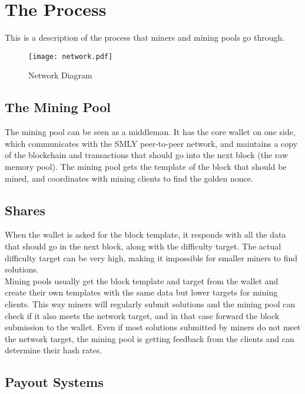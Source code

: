 \section{The Process}

This is a description of the process that miners and mining pools go through.

\begin{figure}[h]
    \centering
    \texttt{[image: network.pdf]}
    \caption{Network Diagram}
    \label{fig:block_header}
\end{figure}

\subsection{The Mining Pool}

The mining pool can be seen as a middleman. It has the core wallet on one side, which communicates with the SMLY peer-to-peer network, and maintains a copy of the blockchain and transactions that should go into the next block (the raw memory pool). The mining pool gets the template of the block that should be mined, and coordinates with mining clients to find the golden nonce.

\subsection{Shares}

When the wallet is asked for the block template, it responds with all the data that should go in the next block, along with the difficulty target. The actual difficulty target can be very high, making it impossible for smaller miners to find solutions. \\

Mining pools usually get the block template and target from the wallet and create their own templates with the same data but lower targets for mining clients. This way miners will regularly submit solutions and the mining pool can check if it also meets the network target, and in that case forward the block submission to the wallet. Even if most solutions submitted by miners do not meet the network target, the mining pool is getting feedback from the clients and can determine their hash rates.

\subsection{Payout Systems}

